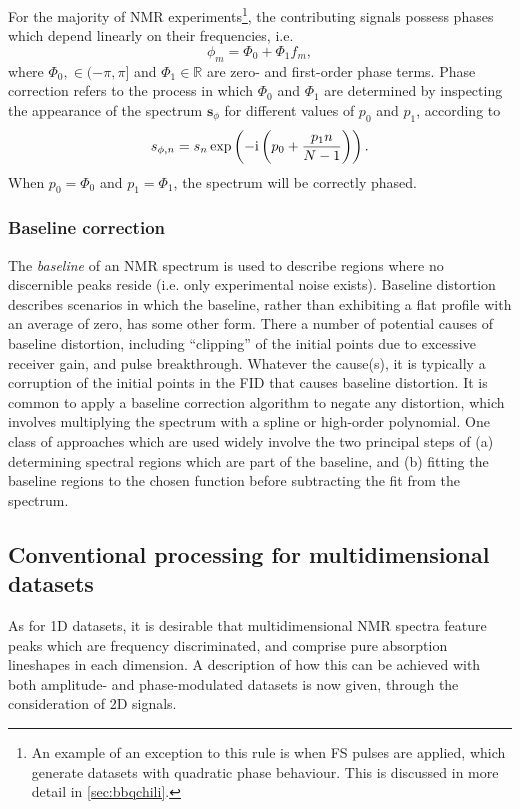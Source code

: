 For the majority of \ac{NMR} experiments\footnote{
     An example of an exception to this rule is when \acl{FS} pulses are applied,
     which generate datasets with quadratic phase behaviour. This is discussed
     in more detail in \cref{sec:bbqchili}.
}, the contributing signals possess phases which depend linearly on their
frequencies, i.e.
\begin{equation}
    \phi_m = \Phi_0 + \Phi_1 f_m,
\end{equation}
where $\Phi_0, \in (-\pi, \pi]$ and $\Phi_1 \in \mathbb{R}$ are zero- and
first-order phase terms.
Phase correction refers to the process in which $\Phi_0$ and $\Phi_1$ are
determined by inspecting the appearance of the spectrum
$\symbf{s}_{\phi}$ for different values of $p_0$ and  $p_1$, according to
\begin{equation}
    s_{\phi,n} = s_n
    \exp\left(-\mathrm{i} \left(p_0 + \frac{p_1 n}{N - 1}\right)\right).
\end{equation}
When $p_0 = \Phi_0$ and  $p_1 = \Phi_1$, the spectrum will be correctly phased.

\subsubsection{Baseline correction}
The \emph{baseline} of an \ac{NMR} spectrum is used to describe regions where
no discernible peaks reside (i.e. only experimental noise exists).
Baseline distortion describes scenarios in which the baseline, rather
than exhibiting a flat profile with an average of zero, has some other form.
There a number of potential causes of baseline distortion, including
``clipping'' of the initial points due to excessive receiver gain,
and pulse breakthrough.
Whatever the cause(s), it is typically a corruption of the initial points in
the \ac{FID} that causes baseline distortion.
It is common to apply a baseline correction algorithm to negate any distortion,
which involves multiplying the spectrum with a spline or high-order polynomial.
One class of approaches which are used widely involve the two principal steps
of (a) determining spectral regions which are part of the baseline, and (b)
fitting the baseline regions to the chosen
function before subtracting the fit from the
spectrum\cite{Dietrich1991,Cobas2006}.

\subsection{Conventional processing for multidimensional datasets}
\label{subsec:multidim}
As for \ac{1D} datasets, it is desirable that multidimensional \ac{NMR} spectra
feature peaks which are frequency discriminated, and comprise pure
absorption lineshapes in each dimension.
A description of how this can be achieved with both amplitude- and
phase-modulated datasets is now given, through the consideration of \ac{2D}
signals.


